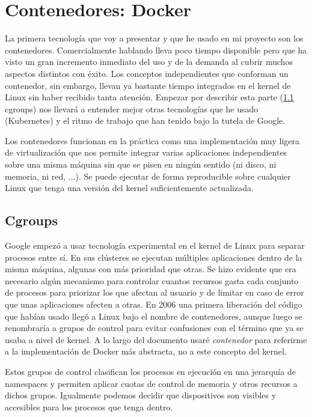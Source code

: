 \chapter{Contenedores: Docker}
\label{chap:docker}

La primera tecnología que voy a presentar y que he usado en mi proyecto son los contenedores. Comercialmente hablando lleva poco tiempo disponible pero que ha visto un gran incremento inmediato del uso y de la demanda al cubrir muchos aspectos distintos con éxito. Los conceptos independientes que conforman un contenedor, sin embargo, llevan ya bastante tiempo integrados en el kernel de Linux sin haber recibido tanta atención. Empezar por describir esta parte (\ref{sec:cgroups} cgroups) nos llevará a entender mejor otras tecnologías que he usado (Kubernetes) y el ritmo de trabajo que han tenido bajo la tutela de Google.

Los contenedores funcionan en la práctica como una implementación muy ligera de virtualización que nos permite integrar varias aplicaciones independientes sobre una misma máquina sin que se pisen en ningún sentido (ni disco, ni memoria, ni red, ...). Se puede ejecutar de forma reproducible sobre cualquier Linux que tenga una versión del kernel suficientemente actualizada.

\section{Cgroups}
\label{sec:cgroups}

Google empezó a usar tecnología experimental en el kernel de Linux para separar procesos entre sí. En sus clústeres se ejecutan múltiples aplicaciones dentro de la misma máquina\cite{sre2016}, algunas con más prioridad que otras. Se hizo evidente que era necesario algún mecanismo para controlar cuantos recursos gasta cada conjunto de procesos para priorizar los que afectan al usuario y de limitar en caso de error que unas aplicaciones afecten a otras. En 2006 una primera liberación del código que habían usado llegó a Linux bajo el nombre de contenedores\cite{rohitseth2006}, aunque luego se renombraría a grupos de control para evitar confusiones con el término que ya se usaba a nivel de kernel\cite{jonathancorbet2007}. A lo largo del documento usaré \emph{contenedor} para referirme a la implementación de Docker más abstracta, no a este concepto del kernel.

Estos grupos de control clasifican los procesos en ejecución en una jerarquía de namespaces\cite{redhat2016} y permiten aplicar cuotas de control de memoria y otros recursos a dichos grupos. Igualmente podemos decidir que dispositivos son visibles y accesibles para los procesos que tenga dentro.

